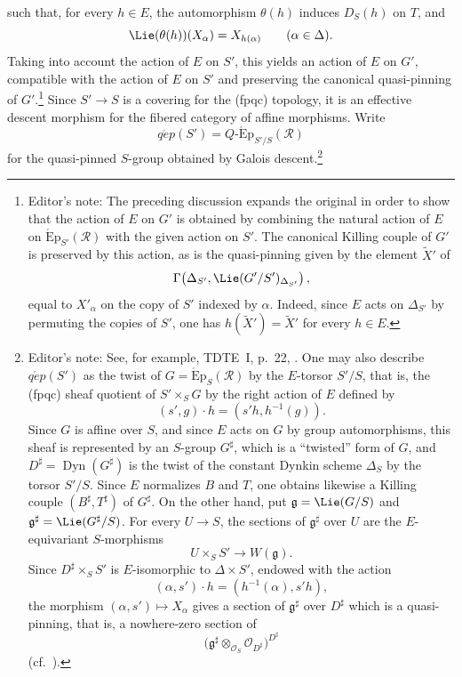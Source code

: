 such that, for every \(h\in E\), the automorphism \(\theta(h)\)
induces \(D_S(h)\) on \(T\), and
\[
  \Lie(\theta(h))(X_\alpha)=X_{h(\alpha)}
  \qquad(\alpha\in\Delta).
\]
Taking into account the action of \(E\) on \(S'\), this yields an
action of \(E\) on \(G'\), compatible with the action of \(E\) on
\(S'\) and preserving the canonical quasi-pinning of
\(G'\).\footnote{Editor's note: The preceding discussion expands the
original in order to show that the action of \(E\) on \(G'\) is
obtained by combining the natural action of \(E\) on
\(\operatorname{\acute{E}p}_{S'}(\mathscr R)\) with the given action
on \(S'\). The canonical Killing couple of \(G'\) is preserved by
this action, as is the quasi-pinning given by the element
\(\widetilde X'\) of
\[
  \Gamma\!\left(
    \Delta_{S'},
    \Lie(G'/S')_{\Delta_{S'}}
  \right),
\]
equal to \(X'_\alpha\) on the copy of \(S'\) indexed by \(\alpha\).
Indeed, since \(E\) acts on \(\Delta_{S'}\) by permuting the copies
of \(S'\), one has \(h(\widetilde X')=\widetilde X'\) for every
\(h\in E\).}
Since \(S'\to S\) is a covering for the \textup{(fpqc)} topology, it
is an effective descent morphism for the fibered category of affine
morphisms. Write
\[
  q\acute{e}p(S')
  =
  Q\text{-}\operatorname{\acute{E}p}_{S'/S}(\mathscr R)
\]
for the quasi-pinned \(S\)-group obtained by Galois
descent.\footnote{Editor's note: See, for example, TDTE~I, p.~22,
. One may also describe \(q\acute{e}p(S')\) as the twist of
\(G=\operatorname{\acute{E}p}_S(\mathscr R)\) by the \(E\)-torsor
\(S'/S\), that is, the \textup{(fpqc)} sheaf quotient of
\(S'\times_SG\) by the right action of \(E\) defined by
\[
  (s',g)\cdot h=(s'h,h^{-1}(g)).
\]
Since \(G\) is affine over \(S\), and since \(E\) acts on \(G\) by
group automorphisms, this sheaf is represented by an \(S\)-group
\(G^\sharp\), which is a ``twisted'' form of \(G\), and
\(D^\sharp=\operatorname{Dyn}(G^\sharp)\) is the twist of the
constant Dynkin scheme \(\Delta_S\) by the torsor \(S'/S\). Since
\(E\) normalizes \(B\) and \(T\), one obtains likewise a Killing
couple \((B^\sharp,T^\sharp)\) of \(G^\sharp\). On the other hand,
put
\(\mathfrak g=\Lie(G/S)\) and
\(\mathfrak g^\sharp=\Lie(G^\sharp/S)\). For every \(U\to S\), the
sections of \(\mathfrak g^\sharp\) over \(U\) are the
\(E\)-equivariant \(S\)-morphisms
\[
  U\times_SS'\longrightarrow W(\mathfrak g).
\]
Since \(D^\sharp\times_SS'\) is \(E\)-isomorphic to
\(\Delta\times S'\), endowed with the action
\[
  (\alpha,s')\cdot h=(h^{-1}(\alpha),s'h),
\]
the morphism \((\alpha,s')\mapsto X_\alpha\) gives a section of
\(\mathfrak g^\sharp\) over \(D^\sharp\) which is a quasi-pinning,
that is, a nowhere-zero section of
\[
  \bigl(
    \mathfrak g^\sharp\otimes_{\mathcal O_S}\mathcal O_{D^\sharp}
  \bigr)^{D^\sharp}
\]
(cf.\ ).
}


